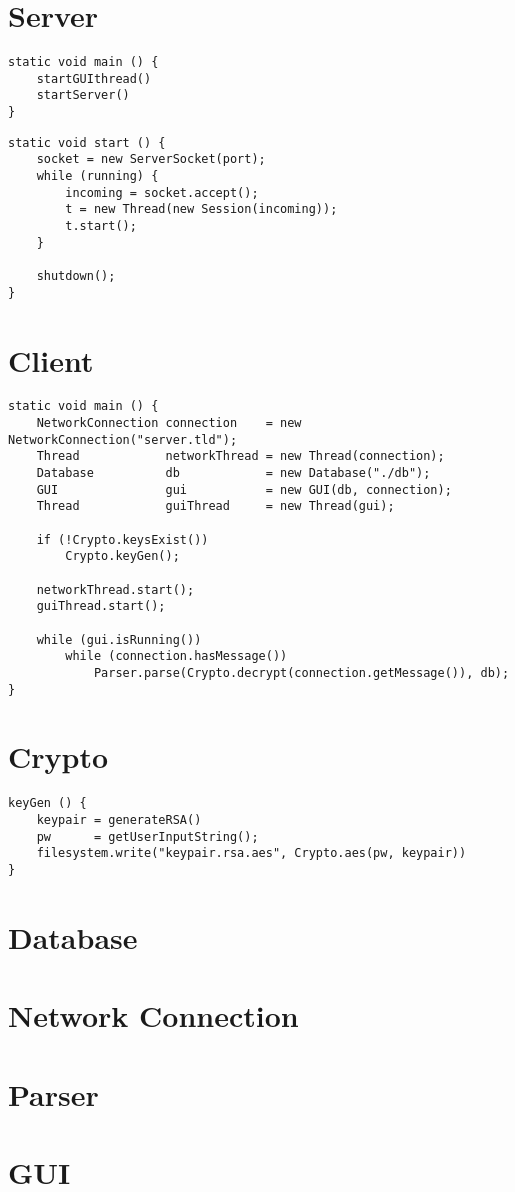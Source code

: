 \section{Server}
\begin{lstlisting}
static void main () {
    startGUIthread()
    startServer()
}
\end{lstlisting}

\begin{lstlisting}
static void start () {
    socket = new ServerSocket(port);
    while (running) {
        incoming = socket.accept();
        t = new Thread(new Session(incoming));
        t.start();
    }
    
    shutdown();
}
\end{lstlisting}

\section{Client}
\begin{lstlisting}
static void main () {
    NetworkConnection connection    = new NetworkConnection("server.tld");
    Thread            networkThread = new Thread(connection);
    Database          db            = new Database("./db");
    GUI               gui           = new GUI(db, connection);
    Thread            guiThread     = new Thread(gui);
        
    if (!Crypto.keysExist())
        Crypto.keyGen();
        
    networkThread.start();
    guiThread.start();
        
    while (gui.isRunning())
        while (connection.hasMessage())
            Parser.parse(Crypto.decrypt(connection.getMessage()), db);
}
\end{lstlisting}

\section{Crypto}
\begin{lstlisting}
keyGen () {
    keypair = generateRSA()
    pw      = getUserInputString();
    filesystem.write("keypair.rsa.aes", Crypto.aes(pw, keypair))
}
\end{lstlisting}

\section{Database}

\section{Network Connection}

\section{Parser}

\section{GUI}

